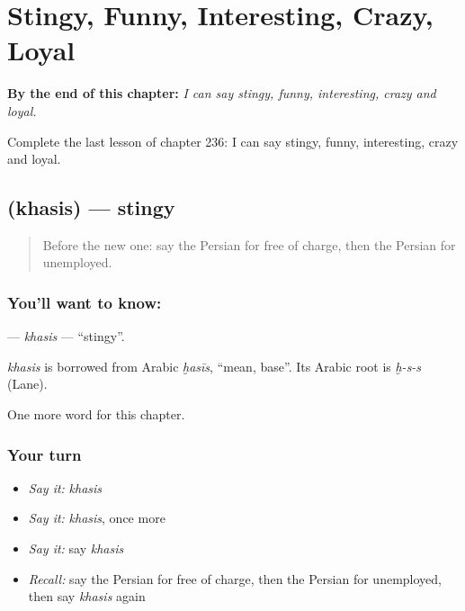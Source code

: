 
\chapter{Stingy, Funny, Interesting, Crazy, Loyal}
\label{ch:fa-stingy-funny-interesting-crazy-loyal}

\begin{chapteropening}
\textbf{By the end of this chapter:} \emph{I can say stingy, funny, interesting, crazy and loyal.}

Complete the last lesson of chapter 236: I can say stingy, funny, interesting, crazy and loyal.
\end{chapteropening}

\section[\texorpdfstring{\fa{خسیس} (khasis)}{خسیس (khasis)}]{ (khasis) — stingy}

\label{lesson:FA-C236-khasis}



\begin{quote}
Before the new one: say the Persian for free of charge, then the Persian for unemployed.
\end{quote}

\subsection*{You'll want to know: }
\textbf{} — \emph{khasis} — \textquotedblleft{}stingy\textquotedblright{}.

\begin{cousinweb}
\emph{khasis} is borrowed from Arabic \emph{ḫasīs}, \textquotedblleft{}mean, base\textquotedblright{}. Its Arabic root is \emph{ḫ-s-s} (Lane).
\end{cousinweb}

\begin{grammarlens}[title={What you've built}]
One more word for this chapter.
\end{grammarlens}

\subsection*{Your turn}
\begin{itemize}
\raggedright
  \item \emph{Say it:} \emph{khasis}
  \item \emph{Say it:} \emph{khasis}, once more
  \item \emph{Say it:} say \emph{khasis}
  \item \emph{Recall:} say the Persian for free of charge, then the Persian for unemployed, then say \emph{khasis} again
\end{itemize}

